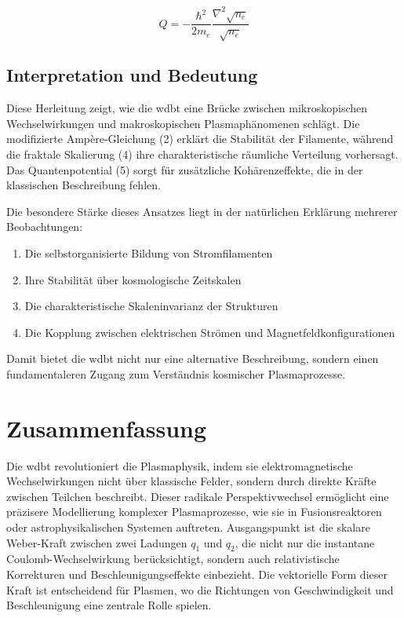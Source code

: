 \begin{equation}
Q = -\frac{\hbar^2}{2m_e} \frac{\nabla^2 \sqrt{n_e}}{\sqrt{n_e}}
\end{equation}

\subsection{Interpretation und Bedeutung}
Diese Herleitung zeigt, wie die \gls{wdbt} eine Brücke zwischen mikroskopischen Wechselwirkungen und makroskopischen Plasmaphänomenen schlägt. Die modifizierte
Ampère-Gleichung (2) erklärt die Stabilität der Filamente, während die fraktale Skalierung (4) ihre charakteristische räumliche Verteilung vorhersagt. Das Quantenpotential (5)
sorgt für zusätzliche Kohärenzeffekte, die in der klassischen Beschreibung fehlen.

Die besondere Stärke dieses Ansatzes liegt in der natürlichen Erklärung mehrerer Beobachtungen:

\begin{enumerate}
    \item Die selbstorganisierte Bildung von Stromfilamenten
    \item Ihre Stabilität über kosmologische Zeitskalen
    \item Die charakteristische Skaleninvarianz der Strukturen
    \item Die Kopplung zwischen elektrischen Strömen und Magnetfeldkonfigurationen
\end{enumerate}

Damit bietet die \gls{wdbt} nicht nur eine alternative Beschreibung, sondern einen fundamentaleren Zugang zum Verständnis kosmischer Plasmaprozesse.

\section{Zusammenfassung}
Die \gls{wdbt} revolutioniert die Plasmaphysik, indem sie elektromagnetische Wechselwirkungen nicht über klassische Felder, sondern durch direkte Kräfte zwischen Teilchen beschreibt.
Dieser radikale Perspektivwechsel ermöglicht eine präzisere Modellierung komplexer Plasmaprozesse, wie sie in Fusionsreaktoren oder astrophysikalischen Systemen auftreten.
Ausgangspunkt ist die skalare Weber-Kraft zwischen zwei Ladungen $q_1$ und $q_2$, die nicht nur die instantane Coulomb-Wechselwirkung berücksichtigt, sondern auch relativistische
Korrekturen und Beschleunigungseffekte einbezieht. Die vektorielle Form dieser Kraft ist entscheidend für Plasmen, wo die Richtungen von Geschwindigkeit und Beschleunigung eine
zentrale Rolle spielen.

